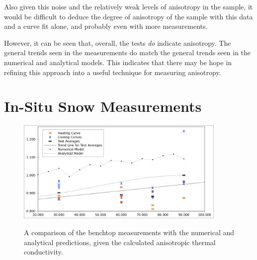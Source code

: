 
Also given this noise and the relatively weak levels of anisotropy in the
sample, it would be difficult to deduce the degree of anisotropy of the sample
with this data and a curve fit alone, and probably even with more measurements.

However, it can be seen that, overall, the tests \emph{do} indicate anisotropy.
The general trends seen in the measurements do match the general trends seen in
the numerical and analytical models. This indicates that there may be hope in
refining this approach into a useful technique for measuring anisotropy.

\section{In-Situ Snow Measurements}

\begin{figure}[h]
\centering
\includegraphics[width=0.9\textwidth]{fig/test_results.png}
\label{fig:test_results}
\caption{A comparison of the benchtop measurements with the numerical and
analytical predictions, given the calculated anisotropic thermal conductivity.}
\end{figure}

